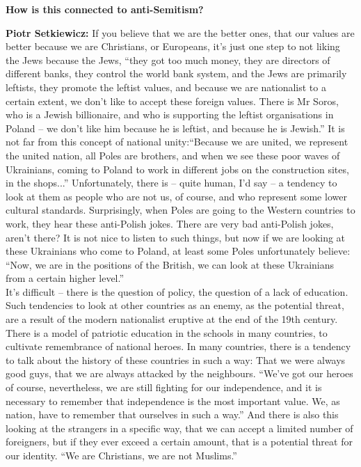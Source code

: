 \textbf{How is this connected to anti-Semitism?} 

\textbf{Piotr Setkiewicz:} If you believe that we are the better ones, that our values are better because we are Christians, or Europeans, it’s just one step to not liking the Jews because the Jews, ``they got too much money, they are directors of different banks, they control the world bank system, and the Jews are primarily leftists, they promote the leftist values, and because we are nationalist to a certain extent, we don’t like to accept these foreign values. There is Mr Soros, who is a Jewish billionaire, and who is supporting the leftist organisations in Poland – we don’t like him because he is leftist, and because he is Jewish.'' It is not far from this concept of national unity:``Because we are united, we represent the united nation, all Poles are brothers, and when we see these poor waves of Ukrainians, coming to Poland to work in different jobs on the construction sites, in the shops...'' Unfortunately, there is – quite human, I’d say – a tendency to look at them as people who are not us, of course, and who represent some lower cultural standards. Surprisingly, when Poles are going to the Western countries to work, they hear these anti-Polish jokes. There are very bad anti-Polish jokes, aren’t there? It is not nice to listen to such things, but now if we are looking at these Ukrainians who come to Poland, at least some Poles unfortunately believe: ``Now, we are in the positions of the British, we can look at these Ukrainians from a certain higher level.'' \\
It’s difficult – there is the question of policy, the question of a lack of education. Such tendencies to look at other countries as an enemy, as the potential threat, are a result of the modern nationalist eruptive at the end of the 19th century. There is a model of patriotic education in the schools in many countries,  to cultivate remembrance of national heroes. In many countries, there is a tendency to talk about the history of these countries in such a way: That we were always good guys, that we are always attacked by the neighbours. ``We’ve got our heroes of course, nevertheless, we are still fighting for our independence, and it is necessary to remember that independence is the most important value. We, as nation, have to remember that ourselves in such a way.'' And there is also this looking at the strangers in a specific way, that we can accept a limited number of foreigners, but if they ever exceed a certain amount, that is a potential threat for our identity. ``We are Christians, we are not Muslims.''\\
